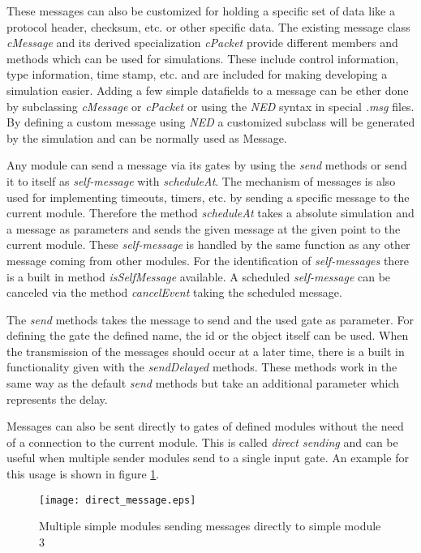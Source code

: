 These messages can also be customized for holding a specific set of data like a protocol header, checksum, etc. or other specific data.
The existing message class \emph{cMessage} and its derived specialization \emph{cPacket} provide different members and methods which can be used for simulations.
These include control information, type information, time stamp, etc. and are included for making developing a simulation easier.
Adding a few simple datafields to a message can be ether done by subclassing \emph{cMessage} or \emph{cPacket} or using the \emph{NED} syntax in special \emph{.msg} files.
By defining a custom message using \emph{NED} a customized subclass will be generated by the simulation and can be normally used as Message. %

Any module can send a message via its gates by using the \emph{send} methods or send it to itself as \emph{self-message} with \emph{scheduleAt}.
The mechanism of messages is also used for implementing timeouts, timers, etc. by sending a specific message to the current module.
Therefore the method \emph{scheduleAt} takes a absolute simulation and a message as parameters and sends the given message at the given point to the current module.
These \emph{self-message} is handled by the same function as any other message coming from other modules.
For the identification of \emph{self-messages} there is a built in method \emph{isSelfMessage} available.
A scheduled \emph{self-message} can be canceled via the method \emph{cancelEvent} taking the scheduled message. \cite[section 4.7.1]{omnet_manual}

The \emph{send} methods takes the message to send and the used gate as parameter.
For defining the gate the defined name, the id or the object itself can be used. \cite[section 4.7.2]{omnet_manual}
When the transmission of the messages should occur at a later time, there is a built in functionality given with the \emph{sendDelayed} methods.
These methods work in the same way as the default \emph{send} methods but take an additional parameter which represents the delay. \cite[section 4.7.6]{omnet_manual}

Messages can also be sent directly to gates of defined modules without the need of a connection to the current module.
This is called \emph{direct sending} and can be useful when multiple sender modules send to a single input gate.
An example for this usage is shown in figure \ref{fig:direct_sending}.

\begin{figure}
        \centering
        \texttt{[image: direct\_message.eps]}
        \caption{Multiple simple modules sending messages directly to simple module 3}
        \label{fig:direct_sending}
\end{figure}

